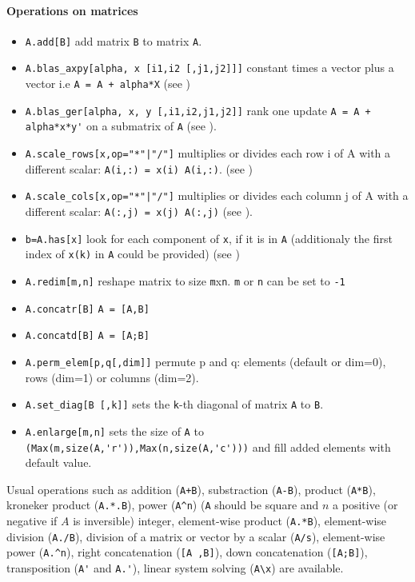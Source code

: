 \paragraph{Operations on matrices}
\begin{itemize}
\item \verb+A.add[B]+  add matrix \verb+B+ to matrix \verb+A+.
\item \verb+A.blas_axpy[alpha, x [i1,i2 [,j1,j2]]]+ constant times a vector plus a vector i.e \verb!A = A + alpha*X!  (see )
\item \verb+A.blas_ger[alpha, x, y [,i1,i2,j1,j2]]+  rank one update \verb!A = A + alpha*x*y'!
  on a submatrix of \verb+A+ (see ).
\item \verb+A.scale_rows[x,op="*"|"/"]+ multiplies or divides each row i of A with a different scalar:
  \verb+A(i,:) = x(i) A(i,:)+.  (see ) 
\item \verb+A.scale_cols[x,op="*"|"/"]+ multiplies or divides each column j of A with a different scalar:
  \verb+A(:,j) = x(j) A(:,j)+ (see ).
\item \verb+b=A.has[x]+ look for each component of \verb+x+, 
  if it is in \verb+A+ (additionaly the first index of \verb+x(k)+ in \verb+A+ could be provided)
  (see )
\end{itemize}
\begin{itemize}
\item \verb+A.redim[m,n]+ reshape matrix to size \verb+m+x\verb+n+. \verb+m+ or \verb+n+ can be set to \verb+-1+ 
\item \verb+A.concatr[B]+ \verb+A = [A,B]+
\item \verb+A.concatd[B]+ \verb+A = [A;B]+
\item \verb+A.perm_elem[p,q[,dim]]+ permute p and q: elements
  (default or dim=0), rows (dim=1) or columns (dim=2).
\item \verb+A.set_diag[B [,k]]+ sets the \verb+k+-th diagonal of matrix \verb+A+ to \verb+B+.
\item \verb+A.enlarge[m,n]+ sets the size of \verb+A+ to \verb+(Max(m,size(A,'r')),Max(n,size(A,'c')))+ and fill 
  added elements with default value.
\end{itemize}


Usual operations such as addition (\verb-A+B-), substraction  (\verb+A-B+), product (\verb+A*B+), 
kroneker product (\verb+A.*.B+), power (\verb+A^n+) (\verb+A+ should be square and $n$ a positive (or negative if $A$
is inversible) integer, element-wise product (\verb+A.*B+), element-wise division (\verb+A./B+), 
division of a matrix or vector by a scalar  (\verb+A/s+), 
element-wise power (\verb+A.^n+), right concatenation  (\verb+[A ,B]+), 
down concatenation  (\verb+[A;B]+), transposition (\verb+A'+ and \verb+A.'+), 
linear system solving (\verb+A\x+) are available.

